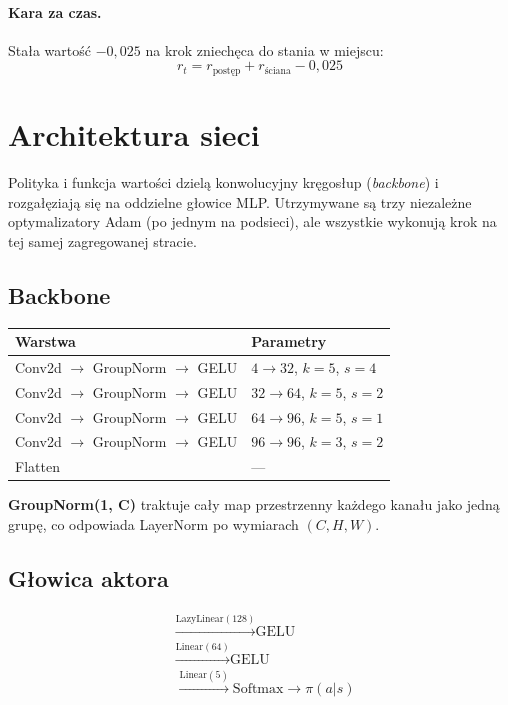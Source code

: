\documentclass[12pt,a4paper,twocolumn]{article}
\begin{document}
\paragraph{Kara za czas.}
Stała wartość $-0{,}025$ na krok zniechęca do stania w miejscu:
\begin{equation}
  r_t = r_\text{postęp} + r_\text{ściana} - 0{,}025
\end{equation}

\section{Architektura sieci}

Polityka i funkcja wartości dzielą konwolucyjny kręgosłup (\textit{backbone}) i rozgałęziają się na oddzielne głowice MLP.
Utrzymywane są trzy niezależne optymalizatory Adam (po jednym na podsieci), ale wszystkie wykonują krok na tej samej zagregowanej stracie.

\subsection{Backbone}

\begin{center}
\begin{tabular}{@{}ll@{}}
  \toprule
  Warstwa & Parametry \\
  \midrule
  Conv2d $\to$ GroupNorm $\to$ GELU & $4{\to}32$, $k{=}5$, $s{=}4$ \\
  Conv2d $\to$ GroupNorm $\to$ GELU & $32{\to}64$, $k{=}5$, $s{=}2$ \\
  Conv2d $\to$ GroupNorm $\to$ GELU & $64{\to}96$, $k{=}5$, $s{=}1$ \\
  Conv2d $\to$ GroupNorm $\to$ GELU & $96{\to}96$, $k{=}3$, $s{=}2$ \\
  Flatten & --- \\
  \bottomrule
\end{tabular}
\end{center}

\textbf{GroupNorm(1, C)} traktuje cały map przestrzenny każdego kanału jako jedną grupę, co odpowiada LayerNorm po wymiarach $(C,H,W)$.

\subsection{Głowica aktora}

\[
\begin{aligned}
  &\xrightarrow{\text{LazyLinear}(128)} \text{GELU} \\
  &\xrightarrow{\text{Linear}(64)} \text{GELU} \\
  &\xrightarrow{\text{Linear}(5)} \text{Softmax} \to \pi(a|s)
\end{aligned}
\]
\end{document}

